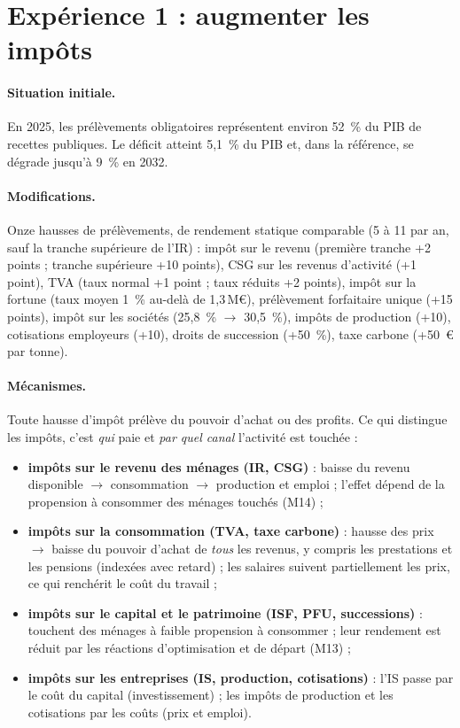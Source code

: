\section{Expérience 1 : augmenter les impôts}
\label{sec:exp1}

\paragraph{Situation initiale.} En 2025, les prélèvements obligatoires représentent environ 52~\% du PIB de recettes
publiques. Le déficit atteint 5,1~\% du PIB et, dans la référence, se dégrade jusqu'à 9~\% en 2032.

\paragraph{Modifications.} Onze hausses de prélèvements, de rendement statique comparable (5 à 11\md{} par an, sauf la
tranche supérieure de l'IR) : impôt sur le revenu (première tranche +2 points ; tranche supérieure +10 points), CSG sur
les revenus d'activité (+1 point), TVA (taux normal +1 point ; taux réduits +2 points), impôt sur la fortune (taux moyen
1~\% au-delà de 1,3\,M€), prélèvement forfaitaire unique (+15 points), impôt sur les sociétés (25,8~\% $\to$ 30,5~\%),
impôts de production (+10\md), cotisations employeurs (+10\md), droits de succession (+50~\%), taxe carbone (+50~€ par
tonne).

\paragraph{Mécanismes.} Toute hausse d'impôt prélève du pouvoir d'achat ou des profits. Ce qui distingue les impôts,
c'est \emph{qui} paie et \emph{par quel canal} l'activité est touchée :
\begin{itemize}
\item \textbf{impôts sur le revenu des ménages (IR, CSG)} : baisse du revenu disponible $\to$ consommation $\to$
production et emploi ; l'effet dépend de la propension à consommer des ménages touchés (M14) ;
\item \textbf{impôts sur la consommation (TVA, taxe carbone)} : hausse des prix $\to$ baisse du pouvoir d'achat de
\emph{tous} les revenus, y compris les prestations et les pensions (indexées avec retard) ; les salaires suivent
partiellement les prix, ce qui renchérit le coût du travail ;
\item \textbf{impôts sur le capital et le patrimoine (ISF, PFU, successions)} : touchent des ménages à faible propension
à consommer ; leur rendement est réduit par les réactions d'optimisation et de départ (M13) ;
\item \textbf{impôts sur les entreprises (IS, production, cotisations)} : l'IS passe par le coût du capital
(investissement) ; les impôts de production et les cotisations par les coûts (prix et emploi).
\end{itemize}

